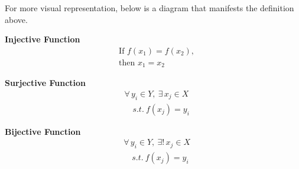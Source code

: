 \documentclass[../../../main.tex]{subfiles}
\begin{document}
For more visual representation, below is a diagram that manifests
the definition above.

\begin{minipage}{0.32\textwidth}
\begin{center}
\textbf{Injective Function}
\begin{align*}
    &\text{If } f(x_1) = f(x_2), \\
    &\text{then } x_1 = x_2
\end{align*}
\end{center}
\end{minipage}
\begin{minipage}{0.32\textwidth}
\begin{center}
\textbf{Surjective Function}
\begin{align*}
    &\forall\, y_i \in Y,\ \exists\, x_j \in X \\
    &\quad s.t.\ f(x_j) = y_i
\end{align*}
\end{center}
\end{minipage}
\begin{minipage}{0.32\textwidth}
\begin{center}
\textbf{Bijective Function}
\begin{align*}
    &\forall\, y_i \in Y,\ \exists!\, x_j \in X \\
    &\quad s.t.\ f(x_j) = y_i
\end{align*}
\end{center}
\end{minipage}
\end{document}
